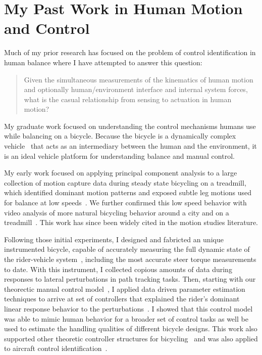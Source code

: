 \documentclass{article}
\begin{document}
\section*{My Past Work in Human Motion and Control}
%
Much of my prior research has focused on the problem of control identification
in human balance where I have attempted to answer this question:

\begin{quote}
  Given the simultaneous measurements of the kinematics of human motion and
  optionally human/environment interface and internal system forces, what is
  the casual relationship from sensing to actuation in human motion?
\end{quote}


My graduate work focused on understanding the control mechanisms humans use
while balancing on a bicycle. Because the bicycle is a dynamically complex
vehicle~\cite{Astrom2005,Meijaard2007,Moore2007,Moore2008} that acts as an
intermediary between the human and the environment, it is an ideal vehicle
platform for understanding balance and manual control.

My early work focused on applying principal component analysis to a large
collection of motion capture data during steady state bicycling on a treadmill,
which identified dominant motion patterns and exposed subtle leg motions used
for balance at low speeds~\cite{Moore2009a,Moore2011c}. We further confirmed
this low speed behavior with video analysis of more natural bicycling behavior
around a city and on a treadmill~\cite{Kooijman2009}. This work has since been
widely cited in the motion studies literature.

Following those initial experiments, I designed and fabricted an unique
instrumented bicycle, capable of accurately measuring the full dynamic state of
the rider-vehicle system~\cite{Moore2012,Moore2013}, including the most
accurate steer torque measurements to date. With this instrument, I collected
copious amounts of data during responses to lateral perturbations in path
tracking tasks. Then, starting with our theorectic manual control
model~\cite{Hess2012}, I applied data driven parameter estimation techniques to
arrive at set of controllers that explained the rider's dominant linear
response behavior to the perturbations~\cite{Moore2012}. I showed that this
control model was able to mimic human behavior for a broader set of control
tasks as well be used to estimate the handling qualities of different bicycle
designs. This work also supported other theoretic controller structures for
bicycling~\cite{Schwab2012a,Schwab2012,Schwab2013} and was also applied to
aircraft control identification~\cite{Hess2013}.
\end{document}
